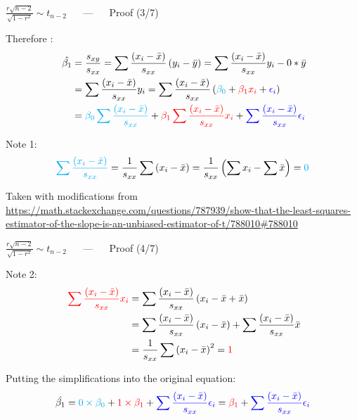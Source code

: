 \documentclass{beamer}
\begin{document}
\begin{frame}
{\centerline{$  \frac{r\sqrt{n-2}}{\sqrt{1-r^2}} \sim t_{n-2}  $  ~~ --- ~~ Proof (3/7)}}

Therefore :
\begin{align*}\
\hat{\beta_1} & = \frac{s_{xy}}{s_{xx}} = \sum \frac{(x_i - \bar{x})}{s_{xx}} \left ( y_i - \bar{y} \right ) = \sum \frac{(x_i - \bar{x})}{s_{xx}} y_i  - 0 * \bar{y} \\
& = \sum \frac{(x_i - \bar{x})}{s_{xx}} y_i  = \sum \frac{(x_i - \bar{x})}{s_{xx}} \left ( \textcolor{cyan}{\beta_0} + \textcolor{red}{\beta_1 x_i} + \textcolor{blue}{\epsilon_i }\right ) \\
& = \textcolor{cyan}{\beta_0 \sum \frac{(x_i - \bar{x})}{s_{xx}}}  + \textcolor{red}{ \beta_1 \sum \frac{(x_i - \bar{x})}{s_{xx}}x_i} + \textcolor{blue}{\sum \frac{(x_i - \bar{x})}{s_{xx}}\epsilon_i }
\end{align*}

Note 1:
$$ \textcolor{cyan}{\sum \frac{(x_i - \bar{x})}{s_{xx}}} = \frac{1}{s_{xx}} \sum \left ( x_i - \bar{x} \right ) =  \frac{1}{s_{xx}} \left ( \sum x_i - \sum \bar{x} \right ) = \textcolor{cyan}{0}$$



\begin{center}
\tiny{Taken with modifications from \url{https://math.stackexchange.com/questions/787939/show-that-the-least-squares-estimator-of-the-slope-is-an-unbiased-estimator-of-t/788010\#788010}}
\end{center}
\end{frame}


\begin{frame}
{\centerline{$  \frac{r\sqrt{n-2}}{\sqrt{1-r^2}} \sim t_{n-2} $  ~~ --- ~~ Proof (4/7)}}

Note 2:
\begin{align*}\
\textcolor{red}{\sum \frac{(x_i - \bar{x})}{s_{xx}}x_i} &= \sum \frac{(x_i - \bar{x})}{s_{xx}} \left ( x_i - \bar{x} + \bar{x} \right ) \\
&= \sum \frac{(x_i - \bar{x})}{s_{xx}} \left ( x_i - \bar{x} \right ) + \sum \frac{(x_i - \bar{x})}{s_{xx}} \bar{x} \\
&=  \frac{1}{s_{xx}} \sum \left ( x_i - \bar{x} \right )^2 = \textcolor{red}{1}
\end{align*}

Putting the simplifications into the original equation:
$$\hat{\beta_1} =  \textcolor{cyan}{0 \times \beta_0} + \textcolor{red}{1 \times \beta_1} + \textcolor{blue}{\sum \frac{(x_i - \bar{x})}{s_{xx}}\epsilon_i} = \textcolor{red}{\beta_1} + \textcolor{blue}{\sum \frac{(x_i - \bar{x})}{s_{xx}}\epsilon_i} $$

\end{frame}
\end{document}
